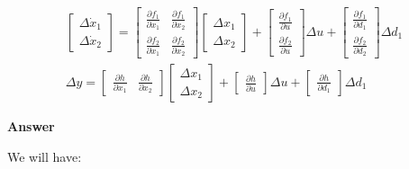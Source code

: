 \begin{eqnarray}
\begin{bmatrix}
 \Delta \dot{x}_1\\
 \Delta \dot{x}_2
\end{bmatrix}= 
\begin{bmatrix}
 \frac{\partial f_1}{\partial x_1} & \frac{\partial f_1}{\partial x_2}   \\
 \frac{\partial f_2}{\partial x_1} & \frac{\partial f_2}{\partial x_2} 
\end{bmatrix}
\begin{bmatrix}
 \Delta x_1  \\
 \Delta x_2  
\end{bmatrix} + 
\begin{bmatrix}
 \frac{\partial f_1}{\partial u}    \\
 \frac{\partial f_2}{\partial u}   
\end{bmatrix} \Delta u +
\begin{bmatrix}
\frac{\partial f_1}{\partial d_1}    \\
\frac{\partial f_2}{\partial d_2} 
\end{bmatrix} \Delta d_1 \nonumber \\
\Delta y = 
\begin{bmatrix}
 \frac{\partial h}{\partial x_1} & \frac{\partial h}{\partial x_2}  
\end{bmatrix}
\begin{bmatrix}
 \Delta x_1  \\
 \Delta x_2  
\end{bmatrix} + 
\begin{bmatrix}
  \frac{\partial h}{\partial u}  
\end{bmatrix} \Delta u +
\begin{bmatrix}
\frac{\partial h}{\partial d_1} 
\end{bmatrix} \Delta d_1
\end{eqnarray}

\textbf{Answer}

We will have:

